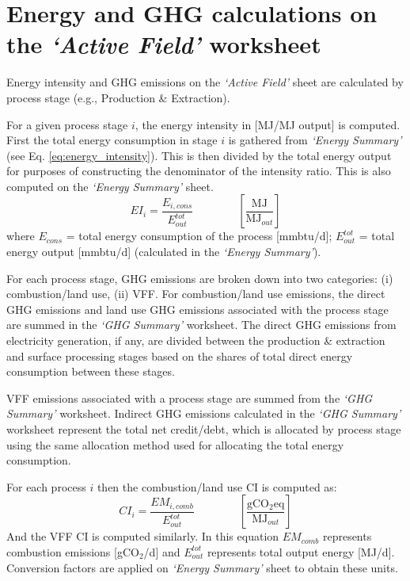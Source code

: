 \documentclass[11pt]{report}
\newcommand{\sheet}[1]{\textit{`{#1}'}}
\newcommand{\eqnunitfrac}[2]{\quad\quad \scriptstyle{\left[\frac{\text{#1}}{\text{#2}}\right]}}
\begin{document}
\section{Energy and GHG calculations on the \sheet{Active Field} worksheet}
Energy intensity and GHG emissions on the \sheet{Active Field} sheet are calculated by process stage (e.g., Production \& Extraction). 

For a given process stage $i$, the energy intensity in [MJ/MJ output] is computed. First the total energy consumption in stage $i$ is gathered from \sheet{Energy Summary} (see Eq. \ref{eq:energy_intensity}). This is then divided by the total energy output for purposes of constructing the denominator of the intensity ratio. This is also computed on the \sheet{Energy Summary} sheet.
\begin{equation} 
\label{eq:energy_intensity}
EI_{i} = \frac{E_{i,cons}}{E^{tot}_{out}} \quad\quad\eqnunitfrac{MJ}{MJ$_{out}$}
\end{equation}
where $E_{cons}$ = total energy consumption of the process [mmbtu/d]; $E^{tot}_{out}$ = total energy output [mmbtu/d] (calculated in the \sheet{Energy Summary}). 

For each process stage, GHG emissions are broken down into two categories: (i) combustion/land use, (ii) VFF. For combustion/land use emissions, the direct GHG emissions and land use GHG emissions associated with the process stage are summed in the \sheet{GHG Summary} worksheet. The direct GHG emissions from electricity generation, if any, are divided between the production \& extraction and surface processing stages based on the shares of total direct energy consumption between these stages. 

VFF emissions associated with a process stage are summed from the \sheet{GHG Summary} worksheet. Indirect GHG emissions calculated in the \sheet{GHG Summary} worksheet represent the total net credit/debt, which is allocated by process stage using the same allocation method used for allocating the total energy consumption.

For each process $i$ then the combustion/land use CI is computed as:
\begin{equation} 
CI_{i} = \frac{EM_{i,comb}}{E^{tot}_{out}} \quad\quad\eqnunitfrac{gCO$_{2}$eq}{MJ$_{out}$}
\end{equation}
And the VFF CI is computed similarly. In this equation $EM_{comb}$ represents combustion emissions [gCO$_2$/d] and $E^{tot}_{out}$ represents total output energy [MJ/d]. Conversion factors are applied on \sheet{Energy Summary} sheet to obtain these units. 
\end{document}
